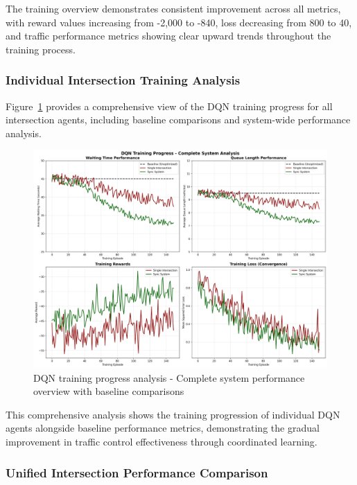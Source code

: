 The training overview demonstrates consistent improvement across all metrics, with reward values 
increasing from -2,000 to -840, loss decreasing from 800 to 40, and traffic performance metrics 
showing clear upward trends throughout the training process.

\subsubsection{Individual Intersection Training Analysis}

Figure~\ref{fig:dqn_training_progress} provides a comprehensive view of the DQN training progress 
for all intersection agents, including baseline comparisons and system-wide performance analysis.

\begin{figure}[!htb]
    \centering
    \includegraphics[width=\textwidth]{figures/ch4_dqn_training_progress.png}
    \caption{DQN training progress analysis - Complete system performance overview with baseline comparisons}
    \label{fig:dqn_training_progress}
\end{figure}

This comprehensive analysis shows the training progression of individual DQN agents alongside 
baseline performance metrics, demonstrating the gradual improvement in traffic control effectiveness 
through coordinated learning.

\subsubsection{Unified Intersection Performance Comparison}

